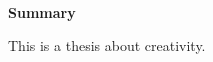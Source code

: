 \begin{titlepage} 
\begin{center}
\HRule \\[0.4cm] { \huge \bfseries Summary\\[0.4cm] }

This is a thesis about creativity.
\end{center}
\end{titlepage}